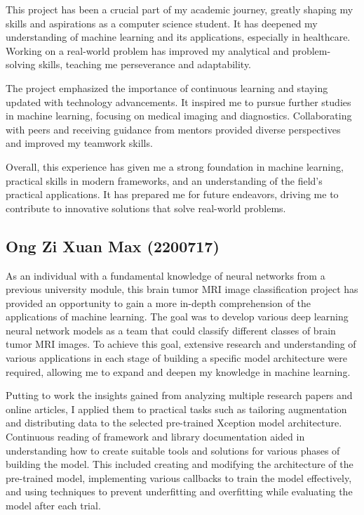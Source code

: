 This project has been a crucial part of my academic journey, greatly shaping my skills and aspirations as a computer science student. It has deepened my understanding of machine learning and its applications, especially in healthcare. Working on a real-world problem has improved my analytical and problem-solving skills, teaching me perseverance and adaptability.

The project emphasized the importance of continuous learning and staying updated with technology advancements. It inspired me to pursue further studies in machine learning, focusing on medical imaging and diagnostics. Collaborating with peers and receiving guidance from mentors provided diverse perspectives and improved my teamwork skills.

Overall, this experience has given me a strong foundation in machine learning, practical skills in modern frameworks, and an understanding of the field's practical applications. It has prepared me for future endeavors, driving me to contribute to innovative solutions that solve real-world problems.


\subsection{Ong Zi Xuan Max (2200717)}\label{ss:ozxm}

As an individual with a fundamental knowledge of neural networks from a previous university module, this brain tumor MRI image classification project has provided an opportunity to gain a more in-depth comprehension of the applications of machine learning. The goal was to develop various deep learning neural network models as a team that could classify different classes of brain tumor MRI images. To achieve this goal, extensive research and understanding of various applications in each stage of building a specific model architecture were required, allowing me to expand and deepen my knowledge in machine learning.

Putting to work the insights gained from analyzing multiple research papers and online articles, I applied them to practical tasks such as tailoring augmentation and distributing data to the selected pre-trained Xception model architecture. Continuous reading of framework and library documentation aided in understanding how to create suitable tools and solutions for various phases of building the model. This included creating and modifying the architecture of the pre-trained model, implementing various callbacks to train the model effectively, and using techniques to prevent underfitting and overfitting while evaluating the model after each trial.

